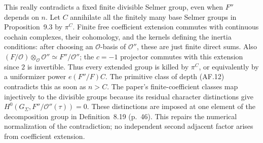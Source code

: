 \documentclass[11pt,a4paper]{article}
\theoremstyle{definition}
\begin{document}
This really contradicts a fixed finite divisible Selmer group, even
when $F''$ depends on $n$.  Let $C$ annihilate all the finitely many
base Selmer groups in Proposition~9.3 by $\pi^C$.  Finite free
coefficient extension commutes with continuous cochain complexes,
their cohomology, and the kernels defining the inertia conditions:
after choosing an $\mathcal O$-basis of $\mathcal O''$, these are
just finite direct sums.  Also
$(F/\mathcal O)\otimes_{\mathcal O}\mathcal O''
\simeq F''/\mathcal O''$; the $c=-1$ projector commutes with
this extension since $2$ is invertible.  Thus every extended group
is killed by $\pi^C$, or equivalently by a uniformizer power
$e(F''/F)C$.  The primitive class of depth (AF.12) contradicts this
as soon as $n>C$.  The paper's finite-coefficient classes map
injectively to the divisible groups because its residual character
distinctions give $H^0(G_\Sigma,F''/\mathcal O''(\tau))=0$.
These distinctions are imposed at one element of the decomposition
group in Definition~8.19 (p.~46).
This repairs the numerical normalization of the contradiction;
no independent second adjacent factor arises from coefficient
extension.
\end{document}
